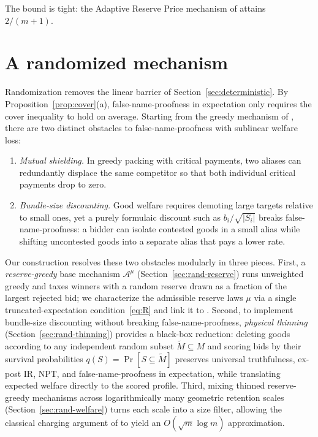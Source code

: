 \documentclass[format=acmsmall, review=false]{acmart}
\theoremstyle{acmdefinition}%
\begin{document}
The bound is tight: the Adaptive Reserve Price mechanism of
\cite{iwasaki2010worst} attains $2/(m+1)$.

\section{A randomized mechanism}
\label{sec:randomized}

Randomization removes the linear barrier of
Section~\ref{sec:deterministic}. By
Proposition~\ref{prop:cover}(a), false-name-proofness in
expectation only requires the cover inequality to hold on average.
Starting from the greedy mechanism of \citet{lehmann2002truth},
there are two distinct obstacles to false-name-proofness with
sublinear welfare loss:
\begin{enumerate}
\item \emph{Mutual shielding.} In greedy packing with critical
payments, two aliases can redundantly displace the same competitor
so that both individual critical payments drop to zero.
\item \emph{Bundle-size discounting.} Good welfare requires
demoting large targets relative to small ones, yet a purely
formulaic discount such as \(b_i/\sqrt{|S_i|}\) breaks
false-name-proofness: a bidder can isolate contested goods in a
small alias while shifting uncontested goods into a separate alias
that pays a lower rate.
\end{enumerate}

Our construction resolves these two obstacles modularly in three
pieces. First, a \emph{reserve-greedy} base mechanism
\(\mathcal A^{\mu}\) (Section~\ref{sec:rand-reserve}) runs
unweighted greedy and taxes winners with a random reserve drawn as
a fraction of the largest rejected bid; we characterize the
admissible reserve laws \(\mu\) via a single truncated-expectation
condition~\eqref{eq:R} and link it to \citet{myerson1981optimal}.
Second, to implement bundle-size discounting without breaking
false-name-proofness, \emph{physical thinning}
(Section~\ref{sec:rand-thinning}) provides a black-box reduction:
deleting goods according to any independent random subset
\(\widetilde M\subseteq M\) and scoring bids by their survival
probabilities \(q(S)=\Pr[S\subseteq\widetilde M]\) preserves
universal truthfulness, ex-post IR, NPT, and false-name-proofness
in expectation, while translating expected welfare directly to the
scored profile. Third, mixing thinned
reserve-greedy mechanisms across logarithmically many geometric
retention scales (Section~\ref{sec:rand-welfare}) turns each scale
into a size filter, allowing the classical charging argument of
\citet[Theorem~3]{lehmann2002truth} to yield an
\(O(\sqrt m\log m)\) approximation.
\end{document}

